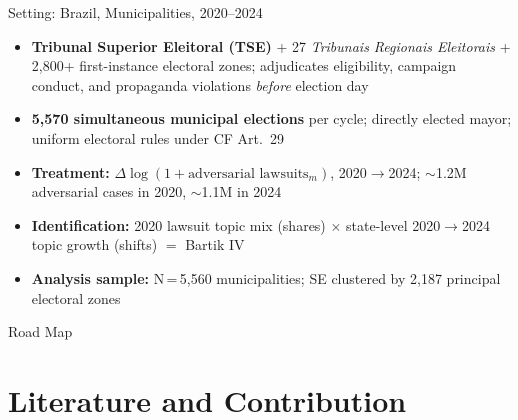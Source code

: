 \documentclass[aspectratio=169,10pt]{beamer}
\begin{document}
\begin{frame}{Setting: Brazil, Municipalities, 2020--2024}
\begin{itemize}
  \item \textbf{Tribunal Superior Eleitoral (TSE)} + 27 \emph{Tribunais Regionais Eleitorais} + 2,800+ first-instance electoral zones; adjudicates eligibility, campaign conduct, and propaganda violations \emph{before} election day
  \item \textbf{5,570 simultaneous municipal elections} per cycle; directly elected mayor; uniform electoral rules under CF Art.~29
  \item \textbf{Treatment:} $\Delta\log(1+\text{adversarial lawsuits}_{m})$, 2020$\to$2024; $\sim$1.2M adversarial cases in 2020, $\sim$1.1M in 2024
  \item \textbf{Identification:} 2020 lawsuit topic mix (shares) $\times$ state-level 2020$\to$2024 topic growth (shifts) $=$ Bartik IV
  \item \textbf{Analysis sample:} N\,=\,5,560 municipalities; SE clustered by 2,187 principal electoral zones
\end{itemize}
\end{frame}


\begin{frame}{Road Map}
\tableofcontents
\end{frame}


\section{Literature and Contribution}
\end{document}
